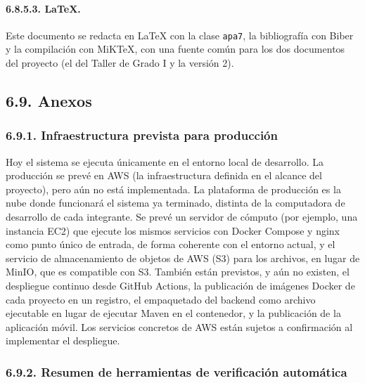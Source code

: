 \paragraph{6.8.5.3. LaTeX.}

Este documento se redacta en LaTeX con la clase \texttt{apa7}, la bibliografía con Biber y la compilación con MiKTeX, con una fuente común para los dos documentos del proyecto (el del Taller de Grado I y la versión 2).

\subsection{6.9. Anexos}

\subsubsection{6.9.1. Infraestructura prevista para producción}

Hoy el sistema se ejecuta únicamente en el entorno local de desarrollo. La producción se prevé en AWS (la infraestructura definida en el alcance del proyecto), pero aún no está implementada. La plataforma de producción es la nube donde funcionará el sistema ya terminado, distinta de la computadora de desarrollo de cada integrante. Se prevé un servidor de cómputo (por ejemplo, una instancia EC2) que ejecute los mismos servicios con Docker Compose y nginx como punto único de entrada, de forma coherente con el entorno actual, y el servicio de almacenamiento de objetos de AWS (S3) para los archivos, en lugar de MinIO, que es compatible con S3. También están previstos, y aún no existen, el despliegue continuo desde GitHub Actions, la publicación de imágenes Docker de cada proyecto en un registro, el empaquetado del backend como archivo ejecutable en lugar de ejecutar Maven en el contenedor, y la publicación de la aplicación móvil. Los servicios concretos de AWS están sujetos a confirmación al implementar el despliegue.

\subsubsection{6.9.2. Resumen de herramientas de verificación automática}

